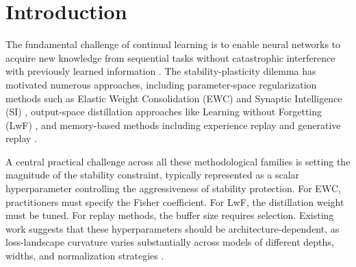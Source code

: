 \documentclass[11pt]{article}
\newcommand{\eps}{\varepsilon}
\newcommand{\epsstar}{\eps^{*}}
\begin{document}
\begin{abstract}
(from $\tau=2.13$ to $1.03$) and gives a corrected population-level
crossover of $\epsstar=11.07\pm0.25$. At this larger, adequately powered
sample, the four purely curvature-based statistics this work tests (Hessian trace,
Fisher trace, spectral norm, gradient norm) remain uncorrelated with
$\epsstar$, confirming the original curvature-irrelevance claim on grounds
its own underpowered $n=8$ test could not support, though model size shows
a small trend worth further testing. Cross-method comparison on a matched
architecture subset shows LwF exhibits the same qualitative universal
crossover while EWC and SI show none, and further robustness checks (KL
direction, task ordering, class-incremental evaluation, task granularity)
both support and further qualify the picture. A pretrained ViT-B/16 with a
LoRA adapter on Split CIFAR-100, a setting closer to how continual
learning is actually practiced, shows FTR's seed-to-seed forgetting
variance an order of magnitude tighter than the next best method, with
mean forgetting and accuracy also, by a smaller margin, the best of the
four. Together, these
results invert the original study's practical guidance: architecture-specific
tuning of the stability budget is largely unnecessary, but the dual-ascent
schedule that enforces it is not a free implementation detail, and
checking sensitivity to it, ideally by reporting $S$, belongs in the
standard protocol for Lagrangian-constrained continual learning.
\end{abstract}

\section{Introduction}
\label{sec:intro}

The fundamental challenge of continual learning is to enable neural networks
to acquire new knowledge from sequential tasks without catastrophic
interference with previously learned information \citep{mccloskey1989catastrophic,robins1995catastrophic}.
The stability-plasticity dilemma has motivated numerous approaches, including
parameter-space regularization methods such as Elastic Weight Consolidation
(EWC) \citep{kirkpatrick2017overcoming} and Synaptic Intelligence (SI)
\citep{zenke2017continual}, output-space distillation approaches like
Learning without Forgetting (LwF) \citep{li2017learning}, and memory-based
methods including experience replay \citep{lopezpaz2017gradient} and
generative replay \citep{shin2017continual}.

A central practical challenge across all these methodological families is
setting the magnitude of the stability constraint, typically represented as a
scalar hyperparameter controlling the aggressiveness of stability protection.
For EWC, practitioners must specify the Fisher coefficient. For LwF, the
distillation weight must be tuned. For replay methods, the buffer size
requires selection. Existing work suggests that these hyperparameters should
be architecture-dependent, as loss-landscape curvature varies substantially
across models of different depths, widths, and normalization strategies
\citep{keskar2016large,ghorbani2019investigation,li2018visualizing}.
\end{document}

